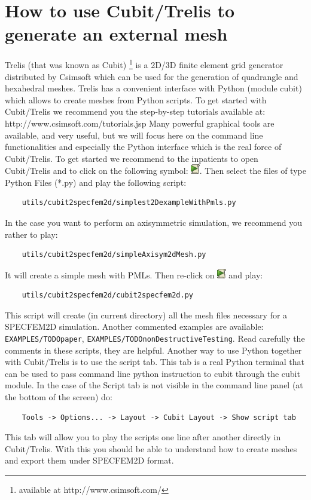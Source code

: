 \section{How to use Cubit/Trelis to generate an external mesh}
Trelis (that was known as Cubit)%
\footnote{available at http://www.csimsoft.com/%
} is a 2D/3D finite element grid generator distributed by Csimsoft which can be
used for the generation of quadrangle and hexahedral meshes. Trelis has a convenient
interface with Python (module cubit) which allows to create meshes from Python scripts. To get
started with Cubit/Trelis we recommend you the step-by-step tutorials available at:
http://www.csimsoft.com/tutorials.jsp
Many powerful graphical tools are available, and very useful, but we will focus here on
the command line functionalities and especially the Python interface which is the real force of
Cubit/Trelis.
To get started we recommend to the inpatients to open Cubit/Trelis and to click on the
following symbol: \includegraphics[width=0.15in]{figures/play_journal_file.png}. Then select the
files of type Python Files (*.py) and play the following script:
\begin{verbatim}
    utils/cubit2specfem2d/simplest2DexampleWithPmls.py
\end{verbatim}
In the case you want to perform an axisymmetric simulation, we recommend you rather to play:
\begin{verbatim}
    utils/cubit2specfem2d/simpleAxisym2dMesh.py
\end{verbatim}
It will create a simple mesh with PMLs. Then re-click on \includegraphics[width=0.15in]{figures/play_journal_file.png} and
play:
\begin{verbatim}
    utils/cubit2specfem2d/cubit2specfem2d.py
\end{verbatim}
This script will create (in current directory) all the mesh files necessary for a SPECFEM2D simulation.
Another commented examples are available: \texttt{EXAMPLES/TODOpaper}, \texttt{EXAMPLES/TODOnonDestructiveTesting}. %
Read carefully the comments in these scripts, they are helpful.
Another way to use Python together with Cubit/Trelis is to use the script tab.
This tab is a real Python terminal that can be used to pass command line python
instruction to cubit through the cubit module.
In the case of the Script tab is not visible in the command line panel (at the bottom of the screen) do:
\begin{verbatim}
    Tools -> Options... -> Layout -> Cubit Layout -> Show script tab
\end{verbatim}
This tab will allow you to play the scripts one line after another directly in Cubit/Trelis.
With this you should be able to understand how to create meshes and export them under SPECFEM2D format.


